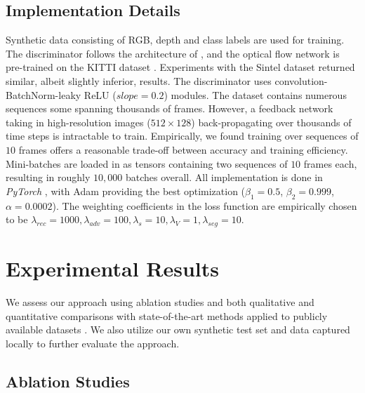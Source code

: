 \documentclass[10pt,twocolumn,letterpaper]{article}
\begin{document}
{\subsection{Implementation Details}
\label{ssec:implementation_approach}

Synthetic data \cite{RosCVPR16} consisting of RGB, depth and class labels are used for training. The discriminator follows the architecture of \cite{radford2015unsupervised}, and the optical flow network \cite{ranjan2017optical} is pre-trained on the KITTI dataset \cite{Menze2018JPRS}. Experiments with the Sintel dataset \cite{ButlerECCV2012} returned similar, albeit slightly inferior, results. The discriminator uses convolution-BatchNorm-leaky ReLU ($slope=0.2$) modules. The dataset \cite{RosCVPR16} contains numerous sequences some spanning thousands of frames. However, a feedback network taking in high-resolution images ($512 \times 128$) back-propagating over thousands of time steps is intractable to train. Empirically, we found training over sequences of $10$ frames offers a reasonable trade-off between accuracy and training efficiency. Mini-batches are loaded in as tensors containing two sequences of $10$ frames each, resulting in roughly $10,000$ batches overall. All implementation is done in \emph{PyTorch} \cite{pytorch}, with Adam \cite{kingma2014adam} providing the best optimization ($\beta_{1} = 0.5$, $\beta_{2} = 0.999$, $\alpha = 0.0002$). The weighting coefficients in the loss function are empirically chosen to be $\lambda_{rec} = 1000, \lambda_{adv} = 100, \lambda_{s} = 10, \lambda_{V} = 1, \lambda_{seg} = 10$.\vspace{-0.1cm}

\section{Experimental Results}
\label{sec:results}\vspace{-0.1cm}

We assess our approach using ablation studies and both qualitative and quantitative comparisons with state-of-the-art methods applied to publicly available datasets \cite{Alhaija2018IJCV, brostow2009semantic, cordts2016cityscapes, Geiger2013IJRR, Menze2018JPRS}. We also utilize our own synthetic test set and data captured locally to further evaluate the approach.

\subsection{Ablation Studies}
\label{ssec:ablation}\vspace{-0.1cm}

}
\end{document}
